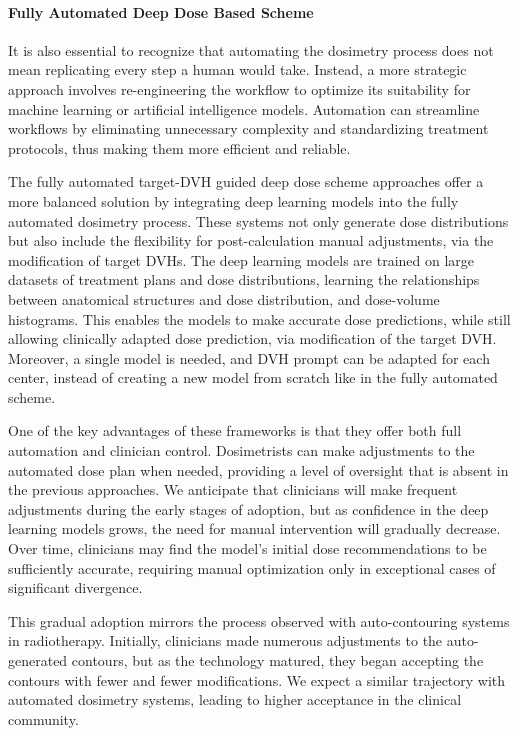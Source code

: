 \paragraph{Fully Automated Deep Dose Based Scheme}
It is also essential to recognize that automating the dosimetry process does not mean replicating every step a human would take.
Instead, a more strategic approach involves re-engineering the workflow to optimize its suitability for machine learning or artificial intelligence models.
Automation can streamline workflows by eliminating unnecessary complexity and standardizing treatment protocols, thus making them more efficient and reliable.

The fully automated target-DVH guided deep dose scheme approaches offer a more balanced solution by integrating deep learning models into the fully automated dosimetry process.
These systems not only generate dose distributions but also include the flexibility for post-calculation manual adjustments, via the modification of target DVHs.
The deep learning models are trained on large datasets of treatment plans and dose distributions, learning the relationships between anatomical structures and dose distribution, and dose-volume histograms.
This enables the models to make accurate dose predictions, while still allowing clinically adapted dose prediction, via modification of the target DVH.
Moreover, a single model is needed, and DVH prompt can be adapted for each center, instead of creating a new model from scratch like in the fully automated scheme.

One of the key advantages of these frameworks is that they offer both full automation and clinician control.
Dosimetrists can make adjustments to the automated dose plan when needed, providing a level of oversight that is absent in the previous approaches.
We anticipate that clinicians will make frequent adjustments during the early stages of adoption, but as confidence in the deep learning models grows, the need for manual intervention will gradually decrease.
Over time, clinicians may find the model's initial dose recommendations to be sufficiently accurate, requiring manual optimization only in exceptional cases of significant divergence.

This gradual adoption mirrors the process observed with auto-contouring systems in radiotherapy.
Initially, clinicians made numerous adjustments to the auto-generated contours, but as the technology matured, they began accepting the contours with fewer and fewer modifications.
We expect a similar trajectory with automated dosimetry systems, leading to higher acceptance in the clinical community.

